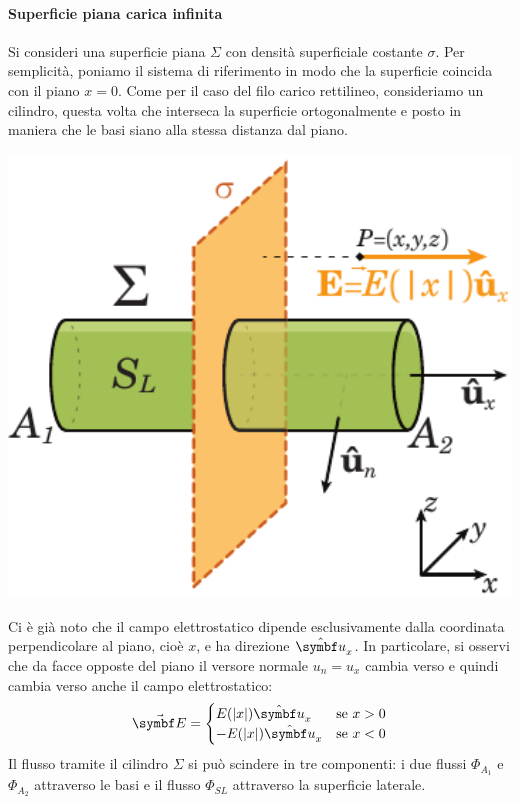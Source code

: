 \paragraph{Superficie piana carica infinita}
Si consideri una superficie piana $\Sigma$ con densità superficiale costante $\sigma$. Per semplicità, poniamo il sistema di riferimento in modo che la superficie coincida con il piano $x=0$. Come per il caso del filo carico rettilineo, consideriamo un cilindro, questa volta che interseca la superficie ortogonalmente e posto in maniera che le basi siano alla stessa distanza dal piano.\\
\begin{minipage}{0.43\textwidth}
	\begin{center}
		\includegraphics[width=1\textwidth]{images/chp2/chp2superficieinfinita.pdf}
	\end{center}		%
\end{minipage}\hspace{10pt}
\begin{minipage}{0.56\textwidth}
	Ci è già noto che il campo elettrostatico dipende esclusivamente dalla coordinata perpendicolare al piano, cioè $x$, e ha direzione $\vbh{u}_x$. In particolare, si osservi che da facce opposte del piano il versore normale $u_n=u_x$ cambia verso e quindi cambia verso anche il campo elettrostatico:
	\begin{equation*}
		\vba{E}=
		\begin{cases}
			E(\abs{x})\vbh{u}_x&\text{se}\ x>0\\
			-E(\abs{x})\vbh{u}_x&\text{se}\ x<0
		\end{cases}
	\end{equation*}
	Il flusso tramite il cilindro $\Sigma$ si può scindere in tre componenti: i due flussi $\Phi_{A_1}$ e $\Phi_{A_2}$ attraverso le basi e il flusso $\Phi_{SL}$ attraverso la superficie laterale.
\end{minipage}\\
